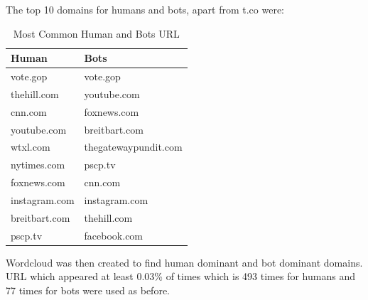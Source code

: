 \documentclass[letterpaper]{article}
\begin{document}
The top 10 domains for humans and bots, apart from t.co were:
\begin{table}
    \centering
    \begin{tabular}{|l|l|}
    \hline
    \textbf{Human} & \textbf{Bots} \\ \hline
    vote.gop & vote.gop \\ \hline
    thehill.com & youtube.com \\ \hline
    cnn.com & foxnews.com \\ \hline
    youtube.com & breitbart.com \\ \hline
    wtxl.com & thegatewaypundit.com \\ \hline
    nytimes.com & pscp.tv \\ \hline
    foxnews.com & cnn.com \\ \hline
    instagram.com & instagram.com \\ \hline
    breitbart.com & thehill.com \\ \hline
    pscp.tv & facebook.com \\ \hline
    \end{tabular}
    \caption{Most Common Human and Bots URL}
    \label{tab:common_human_bots}
\end{table}

Wordcloud was then created to find human dominant and bot dominant domains. URL which appeared at least 0.03\% of times which is 493 times for humans 
and 77 times for bots were used as before.
\end{document}
